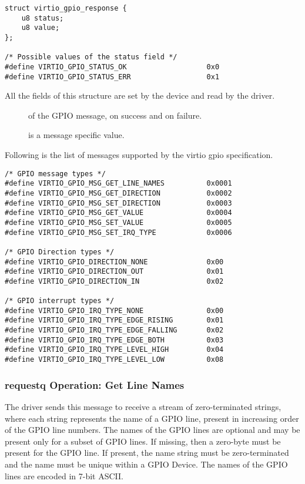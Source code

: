 \begin{lstlisting}
struct virtio_gpio_response {
    u8 status;
    u8 value;
};

/* Possible values of the status field */
#define VIRTIO_GPIO_STATUS_OK                   0x0
#define VIRTIO_GPIO_STATUS_ERR                  0x1
\end{lstlisting}

All the fields of this structure are set by the device and read by the driver.

\begin{description}
\item[] of the GPIO message,
     on success and 
    on failure.

\item[] is a message specific value.
\end{description}

Following is the list of messages supported by the virtio gpio specification.

\begin{lstlisting}
/* GPIO message types */
#define VIRTIO_GPIO_MSG_GET_LINE_NAMES          0x0001
#define VIRTIO_GPIO_MSG_GET_DIRECTION           0x0002
#define VIRTIO_GPIO_MSG_SET_DIRECTION           0x0003
#define VIRTIO_GPIO_MSG_GET_VALUE               0x0004
#define VIRTIO_GPIO_MSG_SET_VALUE               0x0005
#define VIRTIO_GPIO_MSG_SET_IRQ_TYPE            0x0006

/* GPIO Direction types */
#define VIRTIO_GPIO_DIRECTION_NONE              0x00
#define VIRTIO_GPIO_DIRECTION_OUT               0x01
#define VIRTIO_GPIO_DIRECTION_IN                0x02

/* GPIO interrupt types */
#define VIRTIO_GPIO_IRQ_TYPE_NONE               0x00
#define VIRTIO_GPIO_IRQ_TYPE_EDGE_RISING        0x01
#define VIRTIO_GPIO_IRQ_TYPE_EDGE_FALLING       0x02
#define VIRTIO_GPIO_IRQ_TYPE_EDGE_BOTH          0x03
#define VIRTIO_GPIO_IRQ_TYPE_LEVEL_HIGH         0x04
#define VIRTIO_GPIO_IRQ_TYPE_LEVEL_LOW          0x08
\end{lstlisting}

\subsubsection{requestq Operation: Get Line Names}\label{sec:Device Types / GPIO Device / requestq Operation / Get Line Names}

The driver sends this message to receive a stream of zero-terminated strings,
where each string represents the name of a GPIO line, present in increasing
order of the GPIO line numbers. The names of the GPIO lines are optional and may
be present only for a subset of GPIO lines. If missing, then a zero-byte must be
present for the GPIO line. If present, the name string must be zero-terminated
and the name must be unique within a GPIO Device. The names of the GPIO lines
are encoded in 7-bit ASCII.

